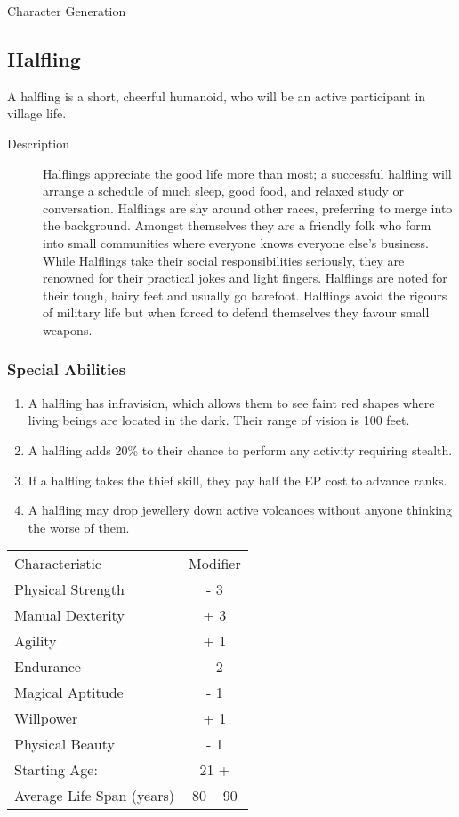 \begin{Chapter}{Character Generation}
\subsection{Halfling}

A halfling is a short, cheerful humanoid, who will be an active
participant in village life.

\begin{description}
\item[Description] Halflings appreciate the good life more than most;
  a successful halfling will arrange a schedule of much sleep, good
  food, and relaxed study or conversation.  Halflings are shy around
  other races, preferring to merge into the background.  Amongst
  themselves they are a friendly folk who form into small communities
  where everyone knows everyone else’s business.  While Halflings take
  their social responsibilities seriously, they are renowned for their
  practical jokes and light fingers.  Halflings are noted for their
  tough, hairy feet and usually go barefoot.  Halflings avoid the
  rigours of military life but when forced to defend themselves they
  favour small weapons.
\end{description}

\subsubsection{Special Abilities}

\begin{enumerate}
\item A halfling has infravision, which allows them to see faint red
  shapes where living beings are located in the dark. Their range of
  vision is 100 feet.

\item A halfling adds 20\% to their chance to perform any activity
  requiring stealth.

\item If a halfling takes the thief skill, they pay half the EP cost
  to advance ranks.

\item A halfling may drop jewellery down active volcanoes without
  anyone thinking the worse of them.
\end{enumerate}

\begin{tabularx}{\columnwidth}{Xc}
Characteristic			& Modifier \\
Physical Strength		& - 3 \\
Manual Dexterity		& + 3 \\
Agility				& + 1 \\
Endurance			& - 2 \\
Magical Aptitude		& - 1 \\
Willpower			& + 1 \\
Physical Beauty			& - 1 \\
Starting Age:			& 21 + \\
Average Life Span (years)	& 80 -- 90 \\
\end{tabularx}


\end{Chapter}
